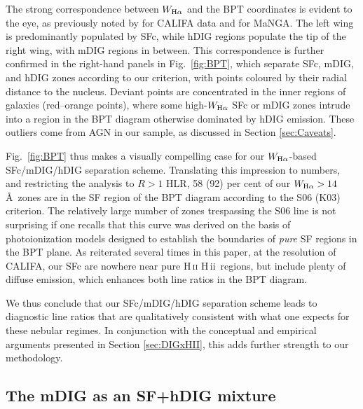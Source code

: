 \documentclass[a4paper, fleqn, usenatbib, useAMS]{mnras}
\newcommand{\Ha}{\ifmmode {\rm H}\alpha \else H$\alpha$\fi\xspace}
\newcommand{\Hii}{\ifmmode \rm{H}\,\textsc{ii} \else H\,{\sc ii}\fi}
\begin{document}
The strong correspondence between $W_{\Ha}$ and the BPT coordinates is evident to the eye, as previously noted by \citet{Morisset.etal.2016} for CALIFA data and \citet{Belfiore.etal.2016} for MaNGA. The left wing is predominantly populated by SFc, while hDIG regions populate the tip of the right wing, with mDIG regions in between. This correspondence is further confirmed in the right-hand panels in Fig.\ \ref{fig:BPT}, which separate SFc, mDIG, and hDIG zones according to our criterion, with points coloured by their radial distance to the nucleus. Deviant points are concentrated in the inner regions of galaxies (red--orange points), where some high-$W_{\Ha}$ SFc or mDIG zones intrude into a region in the BPT diagram otherwise dominated by hDIG emission. These outliers come from AGN in our sample, as discussed in Section \ref{sec:Caveats}.

Fig.\ \ref{fig:BPT} thus makes a visually compelling case for our $W_{\Ha}$-based SFc/mDIG/hDIG separation scheme. Translating this impression to numbers, and restricting the analysis to $R > 1$ HLR, 58 (92)  per cent of our $W_{\Ha} > 14$ \AA\ zones are in the SF region of the BPT diagram according to the S06 (K03)
criterion. The relatively large number of zones trespassing the S06 line is not surprising if one recalls that this curve was derived on the basis of photoionization models designed to establish the boundaries of \textit{pure} SF regions in the BPT plane. As reiterated several times in this paper, at the resolution of CALIFA, our SFc are nowhere near pure \Hii\ regions, but include plenty of diffuse emission, which enhances both line ratios in the BPT diagram.

We thus conclude that our SFc/mDIG/hDIG separation scheme leads to diagnostic line ratios that are qualitatively consistent with what one expects for these nebular regimes. In conjunction with the conceptual and empirical arguments presented in Section \ref{sec:DIGxHII}, this adds further strength to our methodology.

\subsection{The mDIG as an SF+hDIG mixture}
\label{sec:TheNatureOfTheMIG}
\end{document}
